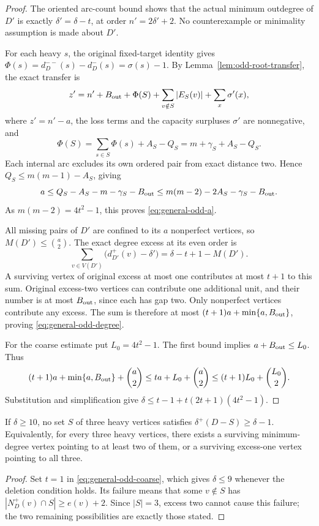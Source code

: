 \begin{proof}
The oriented arc-count bound shows that the actual minimum outdegree
of $D'$ is exactly $\delta'=\delta-t$, at order
$n'=2\delta'+2$.  No counterexample or minimality assumption is made
about $D'$.

For each heavy $s$, the original fixed-target identity gives
$\Phi(s)=d_D^{--}(s)-d_D^-(s)=\sigma(s)-1$.
By Lemma~\ref{lem:odd-root-transfer}, the exact transfer is
\[
 z'=n'+B_{\rm out}+\Phi(S)
       +\sum_{v\notin S}|E_S(v)|+\sum_x\sigma'(x),
\]
where $z'=n'-a$, the loss terms and the capacity surpluses
$\sigma'$ are nonnegative, and
\[
 \Phi(S)=\sum_{s\in S}\Phi(s)+A_S-Q_S
        =m+\gamma_S+A_S-Q_S.
\]
Each internal arc excludes its own ordered pair from exact distance
two.  Hence $Q_S\le m(m-1)-A_S$, giving
\[
 a\le Q_S-A_S-m-\gamma_S-B_{\rm out}
   \le m(m-2)-2A_S-\gamma_S-B_{\rm out}.
\]
As $m(m-2)=4t^2-1$, this proves \eqref{eq:general-odd-a}.

All missing pairs of $D'$ are confined to its $a$ nonperfect
vertices, so $M(D')\le\binom a2$.  The exact degree excess at its
even order is
\[
 \sum_{v\in V(D')}\bigl(d_{D'}^+(v)-\delta'\bigr)
                    =\delta-t+1-M(D').
\]
A surviving vertex of original excess at most one contributes at
most $t+1$ to this sum.  Original excess-two vertices can contribute
one additional unit, and their number is at most $B_{\rm out}$,
since each has gap two.  Only nonperfect vertices contribute any
excess.  The sum is therefore at most
$(t+1)a+\min\{a,B_{\rm out}\}$, proving
\eqref{eq:general-odd-degree}.

For the coarse estimate put $L_0=4t^2-1$.  The first bound implies
$a+B_{\rm out}\le L_0$.  Thus
\[
 (t+1)a+\min\{a,B_{\rm out}\}+\binom a2
 \le ta+L_0+\binom a2
 \le(t+1)L_0+\binom{L_0}{2}.
\]
Substitution and simplification give
$\delta\le t-1+t(2t+1)(4t^2-1)$.
\end{proof}

\begin{corollary}\label{cor:heavy-triple}
If $\delta\ge10$, no set $S$ of three heavy vertices satisfies
$\delta^+(D-S)\ge\delta-1$.
Equivalently, for every three heavy vertices, there exists a surviving
minimum-degree vertex pointing to at least two of them, or a surviving
excess-one vertex pointing to all three.
\end{corollary}
\begin{proof}
Set $t=1$ in \eqref{eq:general-odd-coarse}, which gives $\delta\le9$
whenever the deletion condition holds.
Its failure means that some $v\notin S$ has
$|N_D^+(v)\cap S|\ge e(v)+2$.  Since $|S|=3$, excess two cannot
cause this failure; the two remaining possibilities are exactly
those stated.
\end{proof}

